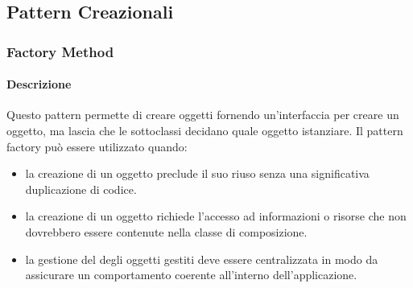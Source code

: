 \newpage
\subsection{Pattern Creazionali}

\subsubsection{Factory Method}
\paragraph{Descrizione}
Questo pattern permette di creare oggetti fornendo un'interfaccia per creare un oggetto, ma lascia che le sottoclassi decidano quale oggetto istanziare.
Il pattern factory può essere utilizzato quando:
\begin{itemize}
\item la creazione di un oggetto preclude il suo riuso senza una significativa duplicazione di codice.
\item la creazione di un oggetto richiede l'accesso ad informazioni o risorse che non dovrebbero essere contenute nella classe di composizione.
\item la gestione del  degli oggetti gestiti deve essere centralizzata in modo da assicurare un comportamento coerente all'interno dell'applicazione.
\end{itemize}

